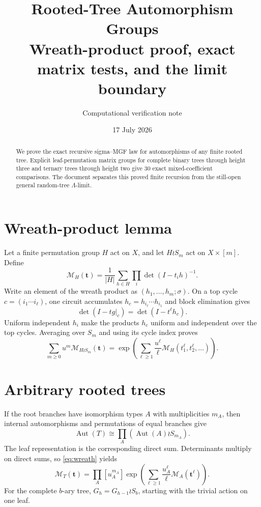 \documentclass[11pt]{article}
\title{\color{navy}\bfseries Rooted-Tree Automorphism Groups\\
\large Wreath-product proof, exact matrix tests, and the limit boundary}
\author{Computational verification note}\date{17 July 2026}
\newcommand{\MGF}{\mathcal M}
\begin{document}
\maketitle

\begin{abstract}
We prove the exact recursive sigma--MGF law for automorphisms of any finite
rooted tree.  Explicit leaf-permutation matrix groups for complete binary
trees through height three and ternary trees through height two give 30 exact
mixed-coefficient comparisons.  The document separates this proved finite
recursion from the still-open general random-tree $\Lambda$-limit.
\end{abstract}

\section{Wreath-product lemma}
Let a finite permutation group $H$ act on $X$, and let $H\wr S_m$ act on
$X\times[m]$.  Define
\[
\MGF_H(\mathbf t)=\frac1{|H|}\sum_{h\in H}
\prod_i\det(I-t_i h)^{-1}.
\]
Write an element of the wreath product as $(h_1,\ldots,h_m;\sigma)$.  On a
top cycle $c=(i_1\cdots i_\ell)$, one circuit accumulates
$h_c=h_{i_\ell}\cdots h_{i_1}$ and block elimination gives
\[
\det(I-tg|_c)=\det(I-t^\ell h_c).
\]
Uniform independent $h_i$ make the products $h_c$ uniform and independent
over the top cycles.  Averaging over $S_m$ and using its cycle index proves
\begin{equation}\label{eq:wreath}
\boxed{\sum_{m\ge0}u^m\MGF_{H\wr S_m}(\mathbf t)=
\exp\left(\sum_{\ell\ge1}\frac{u^\ell}{\ell}
\MGF_H(t_1^\ell,t_2^\ell,\ldots)\right).}
\end{equation}

\section{Arbitrary rooted trees}
If the root branches have isomorphism types $A$ with multiplicities $m_A$,
then internal automorphisms and permutations of equal branches give
\[
\operatorname{Aut}(T)\cong\prod_A(\operatorname{Aut}(A)\wr S_{m_A}).
\]
The leaf representation is the corresponding direct sum.  Determinants
multiply on direct sums, so \eqref{eq:wreath} yields
\begin{equation}\label{eq:tree}
\boxed{\MGF_T(\mathbf t)=\prod_A[u_A^{m_A}]
\exp\left(\sum_{\ell\ge1}\frac{u_A^\ell}{\ell}
\MGF_A(\mathbf t^\ell)\right).}
\end{equation}
For the complete $b$-ary tree, $G_h=G_{h-1}\wr S_b$, starting with the
trivial action on one leaf.
\end{document}
